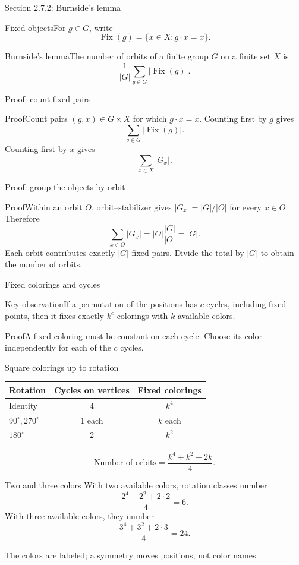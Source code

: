 \documentclass[aspectratio=169,11pt]{beamer}
\newcommand{\Def}[2]{\begin{block}{#1}#2\end{block}}
\newcommand{\Thm}[2]{\begin{block}{#1}#2\end{block}}
\renewcommand{\Proof}[1]{\begin{block}{Proof}\normalsize #1\end{block}}
\newcommand{\gap}{\par\medskip}
\begin{document}
\begin{frame}{Section 2.7.2: Burnside's lemma}
\large
\Def{Fixed objects}{For $g\in G$, write
\[\operatorname{Fix}(g)=\{x\in X:g\cdot x=x\}.\]}
\Thm{Burnside's lemma}{The number of orbits of a finite group $G$ on a finite set $X$ is
\[\frac1{|G|}\sum_{g\in G}|\operatorname{Fix}(g)|.\]}
\end{frame}
\begin{frame}{Proof: count fixed pairs}
\large
\Proof{Count pairs $(g,x)\in G\times X$ for which $g\cdot x=x$. Counting first by $g$ gives
\[\sum_{g\in G}|\operatorname{Fix}(g)|.\]
Counting first by $x$ gives
\[\sum_{x\in X}|G_x|.\]}
\end{frame}
\begin{frame}{Proof: group the objects by orbit}
\large
\Proof{Within an orbit $O$, orbit--stabilizer gives $|G_x|=|G|/|O|$ for every $x\in O$. Therefore
\[\sum_{x\in O}|G_x|=|O|\frac{|G|}{|O|}=|G|.\]
Each orbit contributes exactly $|G|$ fixed pairs. Divide the total by $|G|$ to obtain the number of orbits.}
\end{frame}
\begin{frame}{Fixed colorings and cycles}
\large
\Thm{Key observation}{If a permutation of the positions has $c$ cycles, including fixed points, then it fixes exactly $k^c$ colorings with $k$ available colors.}
\Proof{A fixed coloring must be constant on each cycle. Choose its color independently for each of the $c$ cycles.}
\end{frame}
\begin{frame}{Square colorings up to rotation}
\large
\begin{center}\renewcommand{\arraystretch}{1.5}
\begin{tabular}{lcc}
Rotation & Cycles on vertices & Fixed colorings\\\hline
Identity &4&$k^4$\\
$90^\circ,270^\circ$ &1 each&$k$ each\\
$180^\circ$ &2&$k^2$
\end{tabular}\end{center}
\[\text{Number of orbits}=\frac{k^4+k^2+2k}{4}.\]
\end{frame}
\begin{frame}{Two and three colors}
\large
With two available colors, rotation classes number
\[\frac{2^4+2^2+2\cdot2}{4}=6.\]
With three available colors, they number
\[\frac{3^4+3^2+2\cdot3}{4}=24.\]
\gap The colors are labeled; a symmetry moves positions, not color names.
\end{frame}
\end{document}
